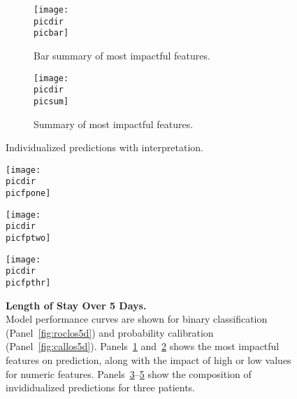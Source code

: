 \begin{figure}
\begin{adjustbox}{minipage={\linewidth},frame}
\begin{subfigure}[t]{.45\linewidth}
    \vspace{2.5mm}
    \centering
    \captionsetup[subfigure]{}
    \caption{Bar summary of most impactful features.}\label{fig:shapsumbarlos5d}
    \texttt{[image: \\picdir\\picbar]}
\end{subfigure}
\begin{subfigure}[t]{.45\linewidth}
    \vspace{2.5mm}
    \centering
    \captionsetup[subfigure]{}
    \caption{Summary of most impactful features.}\label{fig:shapsumlos5d}
    \vspace{-2.3mm}
    \texttt{[image: \\picdir\\picsum]}
    \vspace{2.0mm}
\end{subfigure}
\textsf{Individualized predictions with interpretation.}
\vspace{-2.5mm}
\begin{subfigure}[t]{0.1\textwidth}
    \caption{}\label{fig:shapforcelos5d1}
    \end{subfigure}%
    \begin{minipage}[c]{0.9\textwidth}
    \texttt{[image: \\picdir\\picfpone]}
    \vspace{-2.5mm}
\end{minipage}
\begin{subfigure}[t]{0.1\textwidth}
    \caption{}\label{fig:shapforcelos5d2}
    \end{subfigure}%
    \begin{minipage}[c]{0.9\textwidth}
    \texttt{[image: \\picdir\\picfptwo]}
    \vspace{-3.5mm}
\end{minipage}
\vspace{-4.5mm}
\begin{subfigure}[t]{0.1\textwidth}
    \caption{}\label{fig:shapforcelos5d3}
    \end{subfigure}%
    \begin{minipage}[c]{0.9\textwidth}
    \texttt{[image: \\picdir\\picfpthr]}
    \vspace{-2.5mm}
\end{minipage}
\vspace{-2.5mm}

\caption{\textbf{Length of Stay Over 5 Days.} \\
Model performance curves are shown for binary classification (Panel~\ref{fig:roclos5d}) and probability calibration (Panel~\ref{fig:callos5d}).
Panels~\ref{fig:shapsumbarlos5d} and~\ref{fig:shapsumlos5d} shows the most impactful features on prediction, along with the impact of high or low values for numeric features.
Panels~\ref{fig:shapforcelos5d1}--\ref{fig:shapforcelos5d3} show the composition of invididualized predictions for three patients. 
}\label{fig:los5d}
\end{adjustbox}
\end{figure}
